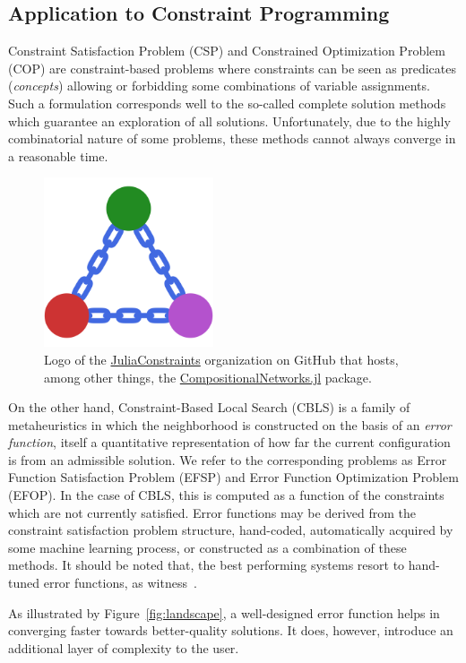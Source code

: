 \documentclass{juliacon}
\newcommand{\csp}{\textsc{CSP}\xspace}
\newcommand{\cop}{\textsc{COP}\xspace}
\newcommand{\efsp}{\textsc{EFSP}\xspace}
\newcommand{\efop}{\textsc{EFOP}\xspace}
\newcommand{\cbls}{\textsc{CBLS}\xspace}
\newcommand{\jc}{\href{https://github.com/JuliaConstraints}{JuliaConstraints}\xspace}
\newcommand{\cnjl}{\href{https://github.com/JuliaConstraints/CompositionalNetworks.jl}{CompositionalNetworks.jl}\xspace}
\begin{document}
\subsection{Application to Constraint Programming}
\label{subsec:cpcontext}

Constraint Satisfaction Problem (\csp) and Constrained Optimization Problem (\cop) are constraint-based problems where constraints can be seen as predicates (\emph{concepts}) allowing or forbidding some combinations of variable assignments.
Such a formulation corresponds well to the so-called complete solution methods which guarantee an exploration of all solutions. Unfortunately, due to the highly combinatorial nature of some problems, these methods cannot always converge in a reasonable time.

\begin{figure}[t]
  \centerline{\includegraphics[width=5cm]{figs/juliaconstraints.png}}
  \caption{Logo of the \jc organization on GitHub that hosts, among other things, the \cnjl package.}
  \label{fig:juliaconstraints}
\end{figure}

On the other hand, Constraint-Based Local Search (\cbls) is a family of metaheuristics in which the neighborhood is constructed on the basis of an \emph{error function}, itself a quantitative representation of how far the current configuration is from an admissible solution. We refer to the corresponding problems as Error Function Satisfaction Problem (\efsp) and Error Function Optimization Problem (\efop). In the case of \cbls, this is computed as a function of the constraints which are not currently satisfied. Error functions may be derived from the constraint satisfaction problem structure, hand-coded, automatically acquired by some machine learning process, or constructed as a combination of these methods. It should be noted that, the best performing systems resort to hand-tuned error functions, as witness~\cite{DBLP:books/sp/18/CodognetMDA18}.

As illustrated by Figure~\ref{fig:landscape}, a well-designed error function helps in converging faster towards better-quality solutions.  It does, however, introduce an additional layer of complexity to the user.
\end{document}
